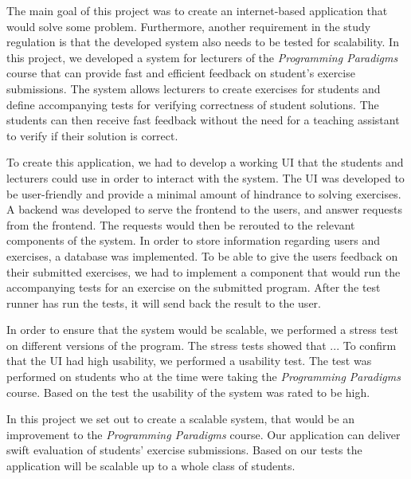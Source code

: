 The main goal of this project was to create an internet-based application that would solve some problem.
Furthermore, another requirement in the study regulation is that the developed system also needs to be tested for scalability. 
In this project, we developed a system for lecturers of the \textit{Programming Paradigms} course that can provide fast and efficient feedback on student's exercise submissions.
The system allows lecturers to create exercises for students and define accompanying tests for verifying correctness of student solutions.
The students can then receive fast feedback without the need for a teaching assistant to verify if their solution is correct. 

To create this application, we had to develop a working UI that the students and lecturers could use in order to interact with the system. The UI was developed to be user-friendly and provide a minimal amount of hindrance to solving exercises.
A backend was developed to serve the frontend to the users, and answer requests from the frontend. 
The requests would then be rerouted to the relevant components of the system. 
In order to store information regarding users and exercises, a database was implemented.
To be able to give the users feedback on their submitted exercises, we had to implement a component that would run the accompanying tests for an exercise on the submitted program. 
After the test runner has run the tests, it will send back the result to the user.

In order to ensure that the system would be scalable, we performed a stress test on different versions of the program. 
The stress tests showed that ... 
To confirm that the UI had high usability, we performed a usability test.
The test was performed on students who at the time were taking the \textit{Programming Paradigms} course.
Based on the test the usability of the system was rated to be high.  

In this project we set out to create a scalable system, that would be an improvement to the \textit{Programming Paradigms} course.
Our application can deliver swift evaluation of students' exercise submissions. Based on our tests the application will be scalable up to a whole class of students.
